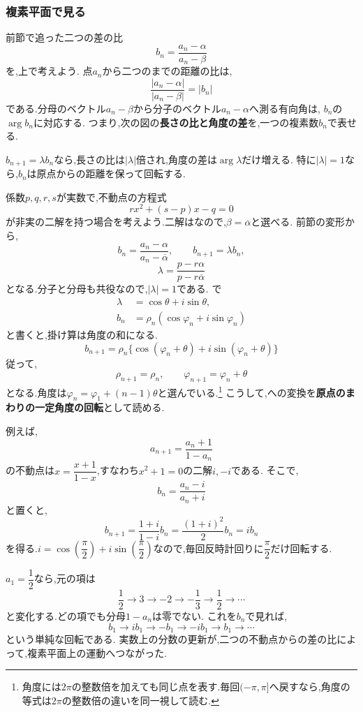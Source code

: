 
\subsubsection{複素平面で見る}

  前節で追った二つの差の比
  \[
    b_n=\frac{a_n-\alpha}{a_n-\beta}
  \]
  を,上で考えよう.
  点$a_n$から二つのまでの距離の比は,
  \[
    \frac{|a_n-\alpha|}{|a_n-\beta|}=|b_n|
  \]
  である.分母のベクトル$a_n-\beta$から分子のベクトル$a_n-\alpha$へ測る有向角は,
  $b_n$の$\arg b_n$に対応する.
  つまり,次の図の\textbf{長さの比と角度の差}を,一つの複素数$b_n$で表せる.
  \BookFigMobius

  $b_{n+1}=\lambda b_n$なら,長さの比は$|\lambda|$倍され,角度の差は$\arg\lambda$だけ増える.
  特に$|\lambda|=1$なら,$b_n$は原点からの距離を保って回転する.

  係数$p,q,r,s$が実数で,不動点の方程式
  \[
    rx^2+(s-p)x-q=0
  \]
  が非実の二解を持つ場合を考えよう.二解はなので,$\beta=\overline\alpha$と選べる.
  前節の変形から,
  \[
    b_n=\frac{a_n-\alpha}{a_n-\overline\alpha},\qquad
    b_{n+1}=\lambda b_n,
  \]
  \[
    \lambda=\frac{p-r\alpha}{p-r\overline\alpha}
  \]
  となる.分子と分母も共役なので,$|\lambda|=1$である.
  で
  \begin{align*}
    \lambda&=\cos\theta+i\sin\theta,\\
    b_n&=\rho_n(\cos\varphi_n+i\sin\varphi_n)
  \end{align*}
  と書くと,掛け算は角度の和になる.
  \[
    b_{n+1}=\rho_n\{\cos(\varphi_n+\theta)
      +i\sin(\varphi_n+\theta)\}
  \]
  従って,
  \[
    \rho_{n+1}=\rho_n,\qquad
    \varphi_{n+1}=\varphi_n+\theta
  \]
  となる.角度は$\varphi_n=\varphi_1+(n-1)\theta$と選んでいる.\footnote{角度には$2\pi$の整数倍を加えても同じ点を表す.毎回$(-\pi,\pi]$へ戻すなら,角度の等式は$2\pi$の整数倍の違いを同一視して読む.}
  こうして,への変換を\textbf{原点のまわりの一定角度の回転}として読める.

  例えば,
  \[
    a_{n+1}=\frac{a_n+1}{1-a_n}
  \]
  の不動点は$x=\dfrac{x+1}{1-x}$,すなわち$x^2+1=0$の二解$i,-i$である.
  そこで,
  \[
    b_n=\frac{a_n-i}{a_n+i}
  \]
  と置くと,
  \[
    b_{n+1}=\frac{1+i}{1-i}b_n
      =\frac{(1+i)^2}{2}b_n=ib_n
  \]
  を得る.$i=\cos\left(\dfrac{\pi}{2}\right)+i\sin\left(\dfrac{\pi}{2}\right)$なので,毎回反時計回りに$\dfrac{\pi}{2}$だけ回転する.

  $a_1=\dfrac{1}{2}$なら,元の項は
  \[
    \frac12\longrightarrow3\longrightarrow-2
    \longrightarrow-\frac13\longrightarrow\frac12\longrightarrow\cdots
  \]
  と変化する.どの項でも分母$1-a_n$は零でない.
  これを$b_n$で見れば,
  \[
    b_1\longrightarrow ib_1\longrightarrow-b_1
    \longrightarrow-ib_1\longrightarrow b_1\longrightarrow\cdots
  \]
  という単純な回転である.
  実数上の分数の更新が,二つの不動点からの差の比によって,複素平面上の運動へつながった.
